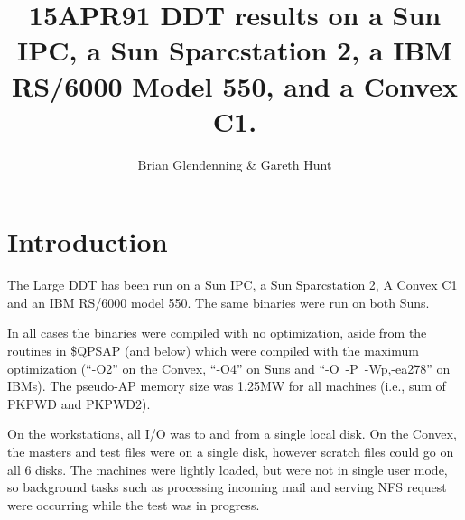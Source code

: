 \title{15APR91 DDT results on a Sun IPC, a Sun Sparcstation 2, a
IBM RS/6000 Model 550, and a Convex C1.}
\author{Brian Glendenning \& Gareth Hunt}

\maketitle

\section{Introduction}

The Large DDT has been run on a Sun IPC, a Sun Sparcstation 2, A
Convex C1 and an IBM RS/6000 model 550.  The same binaries were run on
both Suns.

In all cases the binaries were
compiled with no optimization, aside from the routines in
\$QPSAP (and below) which were compiled with the maximum optimization
(``-O2'' on the Convex, ``-O4'' on Suns and \mbox{``-O -P
-Wp,-ea278''} on IBMs).  The pseudo-AP memory size was 1.25MW for all
machines (i.e., sum of PKPWD and PKPWD2).

On the workstations, all I/O was to and from a single local disk. On
the Convex, the masters and test files were on a single disk, however
scratch files could go on all 6 disks.  The machines were lightly
loaded, but were not in single user mode, so background tasks such as
processing incoming mail and serving NFS request were occurring while
the test was in progress.

